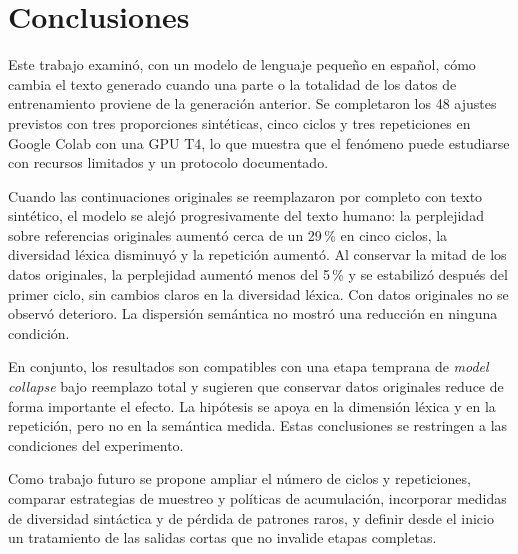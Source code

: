 \documentclass[12pt,letterpaper]{article}
\begin{document}
\section{Conclusiones}

Este trabajo examinó, con un modelo de lenguaje pequeño en español, cómo
cambia el texto generado cuando una parte o la totalidad de los datos de
entrenamiento proviene de la generación anterior. Se completaron los 48
ajustes previstos con tres proporciones sintéticas, cinco ciclos y tres
repeticiones en Google Colab con una GPU T4, lo que muestra que el
fenómeno puede estudiarse con recursos limitados y un protocolo documentado.

Cuando las continuaciones originales se reemplazaron por completo con
texto sintético, el modelo se alejó progresivamente del texto humano: la
perplejidad sobre referencias originales aumentó cerca de un 29\,\% en
cinco ciclos, la diversidad léxica disminuyó y la repetición aumentó. Al
conservar la mitad de los datos originales, la perplejidad aumentó menos
del 5\,\% y se estabilizó después del primer ciclo, sin cambios claros en la
diversidad léxica. Con datos originales no se observó deterioro. La
dispersión semántica no mostró una reducción en ninguna condición.

En conjunto, los resultados son compatibles con una etapa temprana de
\textit{model collapse} bajo reemplazo total y sugieren que conservar datos
originales reduce de forma importante el efecto. La hipótesis se apoya en
la dimensión léxica y en la repetición, pero no en la semántica medida.
Estas conclusiones se restringen a las condiciones del experimento.

Como trabajo futuro se propone ampliar el número de ciclos y repeticiones,
comparar estrategias de muestreo y políticas de acumulación, incorporar
medidas de diversidad sintáctica y de pérdida de patrones raros, y definir
desde el inicio un tratamiento de las salidas cortas que no invalide
etapas completas.
\end{document}

